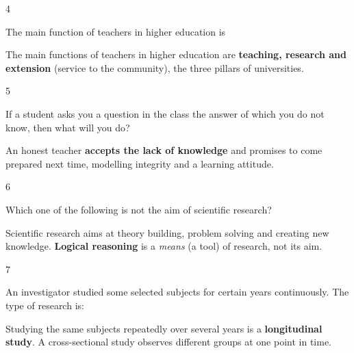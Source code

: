 \begin{question}{4}
{The main function of teachers in higher education is\par}
\begin{explain}
The main functions of teachers in higher education are \textbf{teaching, research and extension} (service to the community), the three pillars of universities.
\end{explain}
\end{question}

\begin{question}{5}
{If a student asks you a question in the class the answer of which you do not know, then what will you do?\par}
\begin{explain}
An honest teacher \textbf{accepts the lack of knowledge} and promises to come prepared next time, modelling integrity and a learning attitude.
\end{explain}
\end{question}

\begin{question}{6}
{Which one of the following is not the aim of scientific research?\par}
\begin{explain}
Scientific research aims at theory building, problem solving and creating new knowledge. \textbf{Logical reasoning} is a \emph{means} (a tool) of research, not its aim.
\end{explain}
\end{question}

\begin{question}{7}
{An investigator studied some selected subjects for certain years continuously. The type of research is:\par}
\begin{explain}
Studying the same subjects repeatedly over several years is a \textbf{longitudinal study}. A cross-sectional study observes different groups at one point in time.
\end{explain}
\end{question}

